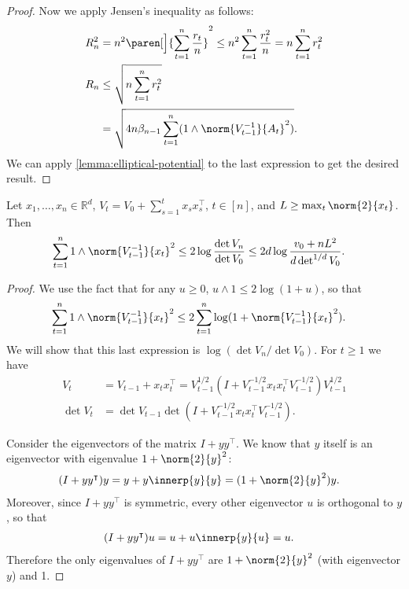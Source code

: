 \documentclass{article}
\newcommand{\inv}[1]{#1^{-1}}
\newcommand{\Real}{\mathds{R}}
\DeclarePairedDelimiter{\paren}()
\newcommand{\transp}[1]{#1^\intercal}
\begin{document}
\begin{theorem}
\begin{proof}
    Now we apply Jensen's inequality as follows:
    \begin{align*}
      R_n^2 &= n^2 \paren[\Big]{\sum_{t=1}^n \frac{r_t}{n}}^2
            \le n^2 \sum_{t=1}^n \frac{r_t^2}{n} = n\sum_{t=1}^nr_t^2 \\
      R_n &\le \sqrt{n\sum_{t=1}^n r_t^2} \\
          &= \sqrt{4n\beta_{n-1} \sum_{t=1}^n (1 \wedge \norm{\inv{V_{t-1}}}{A_t}^2)}.
    \end{align*}
    We can apply \cref{lemma:elliptical-potential} to the last
    expression to get the desired result.
  \end{proof}
\end{theorem}


\begin{lemma}\label{lemma:elliptical-potential}
  Let $x_1,\dotsc,x_n \in \Real^d$,
  $V_t = V_0 + \sum_{s=1}^t x_s \transp{x_s}$, $t\in[n]$, and
  $L \ge \max_t\norm{2}{x_t}$. Then
  \begin{align*}
    \sum_{t=1}^n 1 \wedge \norm{\inv{V_{t-1}}}{x_t}^2
    &\le 2\log\frac{\det V_n}{\det V_0} \le 2d\log\frac{v_0+nL^2}{d\det^{1/d} V_0}.
  \end{align*}

  \begin{proof}
    We use the fact that for any $u \ge 0$, $u \wedge 1 \le
    2\log(1+u)$, so that
    \begin{align*}
      \sum_{t=1}^n 1 \wedge \norm{\inv{V_{t-1}}}{x_t}^2
      &\le 2\sum_{t=1}^n \log(1 + \norm{\inv{V_{t-1}}}{x_t}^2).
    \end{align*}
    We will show that this last expression is $\log(\det V_n/\det
    V_0)$.  For $t \ge 1$ we have
    \begin{align*}
      V_t &= V_{t-1} + x_t\transp{x_t}
           = V_{t-1}^{1/2} (I + V_{t-1}^{-1/2}x_t\transp{x_t}V_{t-1}^{-1/2}) V_{t-1}^{1/2} \\
      \det V_t &= \det V_{t-1}\det(I + V_{t-1}^{-1/2}x_t\transp{x_t}V_{t-1}^{-1/2}).
    \end{align*}

    Consider the eigenvectors of the matrix $I+y\transp{y}$.  We know
    that $y$ itself is an eigenvector with eigenvalue $1+\norm{2}{y}^2$:
    \begin{align*}
      (I + y\transp{y})y &= y + y\innerp{y}{y} = (1+\norm{2}{y}^2)y.
    \end{align*}
    Moreover, since $I+y\transp{y}$ is symmetric, every other
    eigenvector $u$ is orthogonal to $y$, so that
    \begin{align*}
      (I + y\transp{y})u &= u + u\innerp{y}{u} = u.
    \end{align*}
    Therefore the only eigenvalues of $I+y\transp{y}$ are
    $1+\norm{2}{y}^2$ (with eigenvector $y$) and 1.


\end{proof}
\end{lemma}
\end{document}
